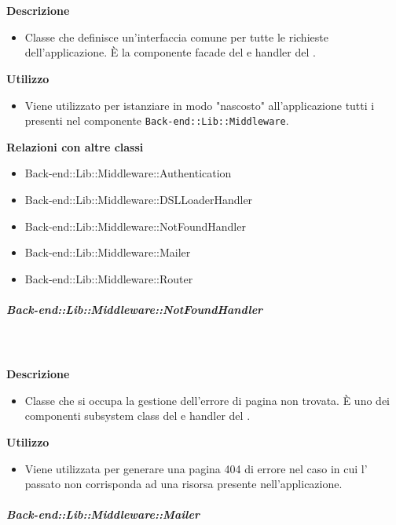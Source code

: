         \textbf{\\ \\ Descrizione} 
          \begin{itemize}
            \item[] Classe che definisce un'interfaccia comune per tutte le richieste dell'applicazione. È la componente facade del   e handler del  .
          \end{itemize}      
        \textbf{Utilizzo}  
          \begin{itemize}
            \item[] Viene utilizzato per istanziare in modo "nascosto" all'applicazione tutti i  presenti nel componente \texttt{Back-end::Lib::Middleware}.
          \end{itemize}
          \textbf{Relazioni con altre classi}
          \begin{itemize}
              \item{Back-end::Lib::Middleware::Authentication}
              \item{Back-end::Lib::Middleware::DSLLoaderHandler}
              \item{Back-end::Lib::Middleware::NotFoundHandler}
              \item{Back-end::Lib::Middleware::Mailer}
              \item{Back-end::Lib::Middleware::Router}
          \end{itemize}
      \subparagraph{Back-end::Lib::Middleware::NotFoundHandler}
        
        \textbf{\\ \\ Descrizione} 
          \begin{itemize}
            \item[] Classe che si occupa la gestione dell'errore di pagina non trovata. È uno dei componenti subsystem class del   e handler del  .
          \end{itemize}      
        \textbf{Utilizzo}  
          \begin{itemize}
            \item[] Viene utilizzata per generare una pagina 404 di errore nel caso in cui l' passato non corrisponda ad una risorsa presente nell'applicazione.
          \end{itemize}
      \subparagraph{Back-end::Lib::Middleware::Mailer}
        
